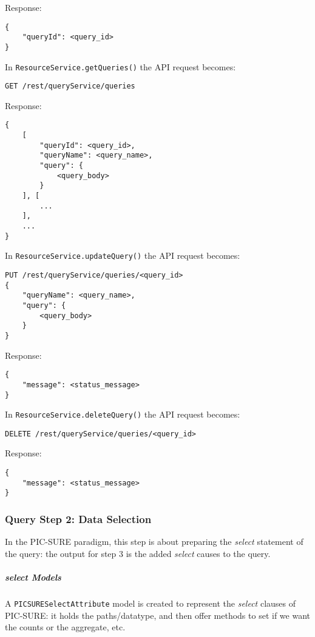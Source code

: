 Response:
\begin{verbatim}
{
    "queryId": <query_id>
}    
\end{verbatim}

In  \verb|ResourceService.getQueries()| the API request becomes:
\begin{verbatim}
GET /rest/queryService/queries
\end{verbatim}

Response:
\begin{verbatim}
{
    [
        "queryId": <query_id>,
        "queryName": <query_name>,
        "query": {
            <query_body>
        }
    ], [
        ...
    ],
    ...
}    
\end{verbatim}

In  \verb|ResourceService.updateQuery()| the API request becomes:
\begin{verbatim}
PUT /rest/queryService/queries/<query_id>
{
    "queryName": <query_name>,
    "query": {
        <query_body>
    }
}
\end{verbatim}

Response:
\begin{verbatim}
{
    "message": <status_message>
} 
\end{verbatim}

In  \verb|ResourceService.deleteQuery()| the API request becomes:
\begin{verbatim}
DELETE /rest/queryService/queries/<query_id>
\end{verbatim}

Response:
\begin{verbatim}
{
    "message": <status_message>
} 
\end{verbatim}


\subsubsection{Query Step 2: Data Selection}

In the PIC-SURE paradigm, this step is about preparing the \emph{select} statement of the query: the output for step 3 is the added \emph{select} causes to the query.

\subparagraph{\emph{select} Models}
A \verb|PICSURESelectAttribute| model is created to represent the \emph{select} clauses of PIC-SURE:
it holds the paths/datatype, and then offer methods to set if we want the counts or the aggregate, etc.

